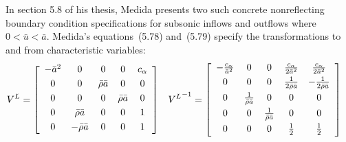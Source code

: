 In section 5.8 of his thesis, Medida presents two such concrete nonreflecting
boundary condition specifications for subsonic inflows and outflows where $0 <
\bar{u} < \bar{a}$.  Medida's equations~(5.78) and~(5.79) specify the
transformations to and from characteristic variables:
\begin{align}
\label{eq:dimeulerapproxmedidaproj}
  V^L &= \left[\begin{array}{ccccc}
    -\bar{a}^2 & 0                   & 0                  & 0                  & c_\alpha \\ \noalign{\smallskip}
    0          & 0                   & \bar{\rho} \bar{a} & 0                  & 0 \\ \noalign{\smallskip}
    0          & 0                   & 0                  & \bar{\rho} \bar{a} & 0 \\ \noalign{\smallskip}
    0          & \bar{\rho} \bar{a}  & 0                  & 0                  & 1 \\ \noalign{\smallskip}
    0          & -\bar{\rho} \bar{a} & 0                  & 0                  & 1 \\ \noalign{\smallskip}
  \end{array}\right]
&  %
  {V^L}^{-1} &= \left[\begin{array}{ccccc}
    -\frac{c_\alpha}{\bar{a}^2} & 0                            & 0                            & \frac{c_\alpha}{2\bar{a}^2}   & \frac{c_\alpha}{2\bar{a}^2}     \\ \noalign{\smallskip}
    0                           & 0                            & 0                            & \frac{1}{2\bar{\rho} \bar{a}} & - \frac{1}{2\bar{\rho} \bar{a}} \\ \noalign{\smallskip}
    0                           & \frac{1}{\bar{\rho} \bar{a}} & 0                            & 0                             & 0                               \\ \noalign{\smallskip}
    0                           & 0                            & \frac{1}{\bar{\rho} \bar{a}} & 0                             & 0                               \\ \noalign{\smallskip}
    0                           & 0                            & 0                            & \frac{1}{2}                   & \frac{1}{2}                     \\ \noalign{\smallskip}
  \end{array}\right]
\end{align}
